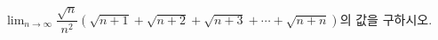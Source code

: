 \hspace*{2mm}\begin{minipage}[t]{\dimexpr\linewidth-2mm\relax}\vspace{0pt}
$\displaystyle\lim_{n\to\infty}\dfrac{\sqrt{n}}{n^2}\left(\sqrt{n+1}+\sqrt{n+2}+\sqrt{n+3}+\cdots+\sqrt{n+n}\right)$의 값을 구하시오.\end{minipage}
